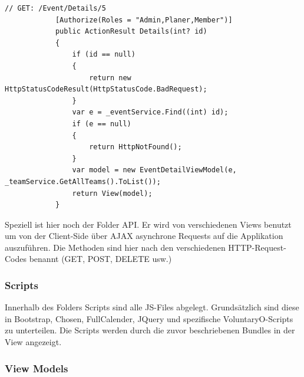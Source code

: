 			\begin{lstlisting}[language=CSharp, caption=EventController.cs, label=lst:Details firstnumber=1]
			// GET: /Event/Details/5
	        [Authorize(Roles = "Admin,Planer,Member")]
	        public ActionResult Details(int? id)
	        {
	            if (id == null)
	            {
	                return new HttpStatusCodeResult(HttpStatusCode.BadRequest);
	            }
	            var e = _eventService.Find((int) id);
	            if (e == null)
	            {
	                return HttpNotFound();
	            }
	            var model = new EventDetailViewModel(e, _teamService.GetAllTeams().ToList());
	            return View(model);
	        }
			\end{lstlisting}

			Speziell ist hier noch der Folder API. Er wird von verschiedenen Views benutzt um von der Client-Side über AJAX asynchrone Requests auf die Applikation auszuführen. Die Methoden sind hier nach den verschiedenen HTTP-Request-Codes benannt (GET, POST, DELETE usw.)

		\subsubsection{Scripts}
			Innerhalb des Folders Scripts sind alle JS-Files abgelegt. Grundsätzlich sind diese in Bootstrap, Chosen, FullCalender, JQuery und spezifische VoluntaryO-Scripts zu unterteilen. Die Scripts werden durch die zuvor beschriebenen Bundles in der View angezeigt.

		\subsubsection{View Models}

